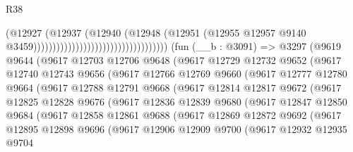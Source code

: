 \begin{lexlean}{R38}
\begin{coremodule}
                                                              (@12927
                                                                (@12937
                                                                  (@12940
                                                                    (@12948
                                                                      (@12951
                                                                        (@12955
                                                                          @12957
                                                                          @9140
                                                                          @3459)))))))))))))))))))))))))))))))))))
    (fun (__b : @3091) =>
    @3297
      (@9619
        @9644
        (@9617
          @12703
          @12706
          @9648
          (@9617
            @12729
            @12732
            @9652
            (@9617
              @12740
              @12743
              @9656
              (@9617
                @12766
                @12769
                @9660
                (@9617
                  @12777
                  @12780
                  @9664
                  (@9617
                    @12788
                    @12791
                    @9668
                    (@9617
                      @12814
                      @12817
                      @9672
                      (@9617
                        @12825
                        @12828
                        @9676
                        (@9617
                          @12836
                          @12839
                          @9680
                          (@9617
                            @12847
                            @12850
                            @9684
                            (@9617
                              @12858
                              @12861
                              @9688
                              (@9617
                                @12869
                                @12872
                                @9692
                                (@9617
                                  @12895
                                  @12898
                                  @9696
                                  (@9617
                                    @12906
                                    @12909
                                    @9700
                                    (@9617
                                      @12932
                                      @12935
                                      @9704

\end{coremodule}
\end{lexlean}
